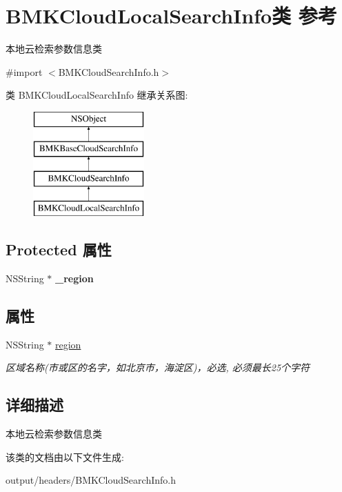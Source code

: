 \hypertarget{interface_b_m_k_cloud_local_search_info}{}\section{B\+M\+K\+Cloud\+Local\+Search\+Info类 参考}
\label{interface_b_m_k_cloud_local_search_info}


本地云检索参数信息类  




{\ttfamily \#import $<$B\+M\+K\+Cloud\+Search\+Info.\+h$>$}

类 B\+M\+K\+Cloud\+Local\+Search\+Info 继承关系图\+:\begin{figure}[H]
\begin{center}
\leavevmode
\includegraphics[height=4.000000cm]{interface_b_m_k_cloud_local_search_info}
\end{center}
\end{figure}
\subsection*{Protected 属性}
\begin{DoxyCompactItemize}
\item 
\hypertarget{interface_b_m_k_cloud_local_search_info_a222e06088269c5b3e67d3f9a416d7eff}{}N\+S\+String $\ast$ {\bfseries \+\_\+region}\label{interface_b_m_k_cloud_local_search_info_a222e06088269c5b3e67d3f9a416d7eff}

\end{DoxyCompactItemize}
\subsection*{属性}
\begin{DoxyCompactItemize}
\item 
\hypertarget{interface_b_m_k_cloud_local_search_info_a0f5a080b5eed8356479c5b3f3e483e29}{}N\+S\+String $\ast$ \hyperlink{interface_b_m_k_cloud_local_search_info_a0f5a080b5eed8356479c5b3f3e483e29}{region}\label{interface_b_m_k_cloud_local_search_info_a0f5a080b5eed8356479c5b3f3e483e29}

\begin{DoxyCompactList}\small\item\em 区域名称(市或区的名字，如北京市，海淀区)，必选, 必须最长25个字符 \end{DoxyCompactList}\end{DoxyCompactItemize}


\subsection{详细描述}
本地云检索参数信息类 

该类的文档由以下文件生成\+:\begin{DoxyCompactItemize}
\item 
output/headers/B\+M\+K\+Cloud\+Search\+Info.\+h\end{DoxyCompactItemize}
